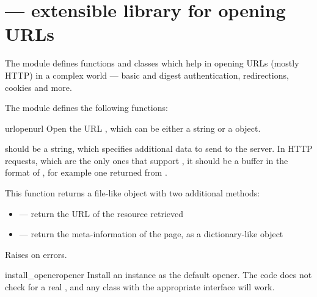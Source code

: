 \section{ ---
         extensible library for opening URLs}



The  module defines functions and classes which help
in opening URLs (mostly HTTP) in a complex world --- basic and digest
authentication, redirections, cookies and more.

The  module defines the following functions:

\begin{funcdesc}{urlopen}{url}
Open the URL , which can be either a string or a 
object.

 should be a string, which specifies additional data to
send to the server. In HTTP requests, which are the only ones that
support , it should be a buffer in the format of
, for example one returned
from .

This function returns a file-like object with two additional methods:

\begin{itemize}
  \item {} --- return the URL of the resource retrieved
  \item {} --- return the meta-information of the page, as
                            a dictionary-like object
\end{itemize}

Raises  on errors.
\end{funcdesc}

\begin{funcdesc}{install_opener}{opener}
Install an  instance as the default opener.
The code does not check for a real , and any
class with the appropriate interface will work.
\end{funcdesc}


